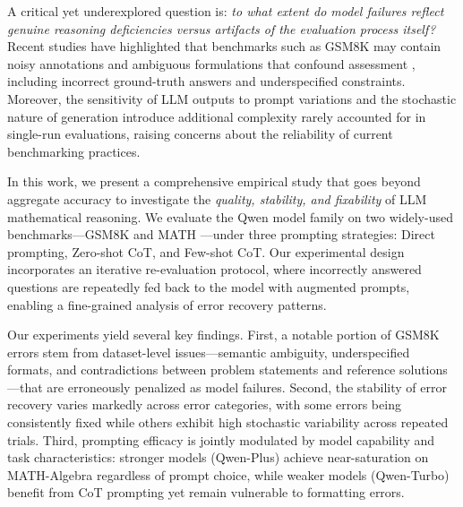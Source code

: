 \documentclass{article}
\begin{document}
A critical yet underexplored question is: \textit{to what extent do model failures reflect genuine reasoning deficiencies versus artifacts of the evaluation process itself?} Recent studies have highlighted that benchmarks such as GSM8K may contain noisy annotations and ambiguous formulations that confound assessment \cite{kismath2024, prolog2024}, including incorrect ground-truth answers and underspecified constraints. Moreover, the sensitivity of LLM outputs to prompt variations and the stochastic nature of generation introduce additional complexity rarely accounted for in single-run evaluations, raising concerns about the reliability of current benchmarking practices.

In this work, we present a comprehensive empirical study that goes beyond aggregate accuracy to investigate the \textit{quality, stability, and fixability} of LLM mathematical reasoning. We evaluate the Qwen model family on two widely-used benchmarks---GSM8K and MATH \cite{hendrycks2021measuring}---under three prompting strategies: Direct prompting, Zero-shot CoT, and Few-shot CoT. Our experimental design incorporates an iterative re-evaluation protocol, where incorrectly answered questions are repeatedly fed back to the model with augmented prompts, enabling a fine-grained analysis of error recovery patterns.

Our experiments yield several key findings. First, a notable portion of GSM8K errors stem from dataset-level issues---semantic ambiguity, underspecified formats, and contradictions between problem statements and reference solutions---that are erroneously penalized as model failures. Second, the stability of error recovery varies markedly across error categories, with some errors being consistently fixed while others exhibit high stochastic variability across repeated trials. Third, prompting efficacy is jointly modulated by model capability and task characteristics: stronger models (Qwen-Plus) achieve near-saturation on MATH-Algebra regardless of prompt choice, while weaker models (Qwen-Turbo) benefit from CoT prompting yet remain vulnerable to formatting errors.
\end{document}

